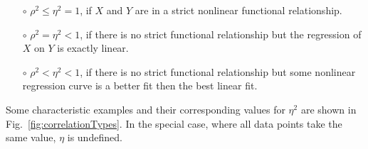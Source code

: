 \begin{itemize}
\begin{itemize}
      \item[$\circ$] $\rho^2 \leq \eta^2=1$, if $X$ and $Y$ are in a
        strict nonlinear functional relationship.

      \item[$\circ$] $\rho^2 = \eta^2 < 1$, if there is no strict
        functional relationship but the regression of $X$ on $Y$ is
        exactly linear.
      
      \item[$\circ$] $\rho^2 < \eta^2 < 1$, if there is no strict
        functional relationship but some nonlinear regression curve is
        a better fit then the best linear fit.

      \end{itemize}
      Some characteristic examples and their corresponding values for $\eta^2$ are 
      shown in Fig.~\ref{fig:correlationTypes}. In the special case, where all data 
      points take the same value, $\eta$ is undefined.


\end{itemize}
